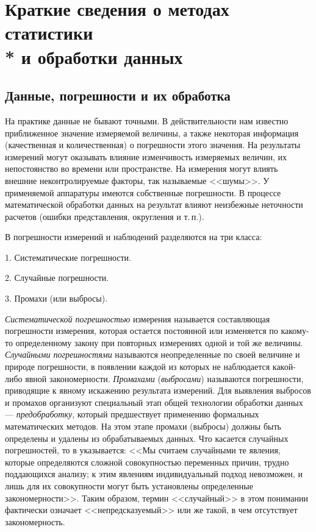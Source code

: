 \documentclass[a5paper,openany]{book}
\begin{document}
{{%
	\chapter[Краткие сведения о методах статистики и обработки данных]%
{Краткие сведения о методах статистики\\* и обработки данных} 

	\section{Данные, погрешности и их обработка} 


На практике данные не бывают точными. В действительности нам известно приближенное
значение измеряемой величины, а также некоторая информация (качественная 
и количественная) о погрешности этого значения.   
На результаты измерений могут оказывать влияние изменчивость измеряемых величин, 
их непостоянство во времени или пространстве. На измерения могут влиять внешние неконтролируемые факторы, так 
называемые <<шумы>>. 
У применяемой аппаратуры имеются собственные погрешности. 
В процессе математической обработки данных на результат влияют
неизбежные неточности расчетов (ошибки представления,  округления и т.\,п.). 

В \cite{Malikov} погрешности измерений и наблюдений разделяются на три класса: 
\begin{list}{}{\leftmargin=14mm\itemsep=5pt\topsep=3pt\parsep=0pt} 
	\item [1.] 
	Систематические погрешности. 
	\item[2.] 
	Случайные погрешности. 
	\item[3.] 
	Промахи (или выбросы).  
\end{list} 

\emph{Систематической погрешностью} измерения называется составляющая погрешности 
измерения, которая остается постоянной или изменяется по какому-то определенному 
закону при повторных измерениях одной и той же величины. \emph{Случайными погрешностями} 
называются неопределенные по своей величине и природе погрешности, в появлении каждой 
из которых не наблюдается какой-либо явной закономерности. 
\emph{Промахами} (\emph{выбросами}) называются погрешности, приводящие к явному 
искажению результата измерений. 
Для выявления выбросов и промахов организуют специальный этап общей технологии 
обработки данных --- \emph{предобработку}, который предшествует применению формальных 
математических методов. На этом этапе промахи (выбросы)   должны быть определены и удалены 
из обрабатываемых данных.                
Что касается случайных погрешностей, то в \cite{Malikov} указывается: <<Мы считаем случайными те явления, которые определяются сложной совокупностью переменных 
причин, трудно поддающихся анализу; к этим явлениям индивидуальный подход невозможен, 
и лишь для их совокупности могут быть установлены определенные закономерности>>. 
Таким образом, термин <<случайный>> в этом понимании  фактически означает
<<непредсказуемый>> или же такой, в чем  отсутствует закономерность. 

}}
\end{document}
